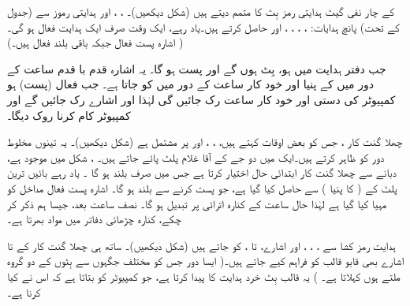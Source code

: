  کے چار   نفی گیٹ  ہدایتی رمز بِٹ  کا متمم دیتے ہیں (شکل  دیکھیں)۔ ، ، اور ہدایتی  رموز سے  (جدول  کے تحت) پانچ  ہدایات: ، ، ، ، اور    حاصل کرتے ہیں۔یاد رہے، ایک وقت صرف ایک ہدایت فعال ہو گی۔ ( اشارہ پست فعال جبکہ باقی بلند فعال ہیں۔)

جب   دفتر ہدایت میں  ہو،  بِٹ  ہوں گے اور    پست ہو گا۔ یہ اشارہ   قدم با قدم  ساعت  کے  دور  میں   کے پنیا  اور خود کار ساعت کے دور میں  کو جاتا ہے۔  جب    فعال (پست) ہو کمپیوٹر کی دستی اور خود کار  ساعت  رک جائیں گی  لہٰذا  اور  اشارے رک جائیں گے اور کمپیوٹر  کام کرنا روک  دیگا۔

چھلا گنت کار ، جس کو بعض اوقات کہتے ہیں، ، ، اور  پر مشتمل ہے (شکل  دیکھیں)۔ یہ  تینوں  مخلوط دور  کو ظاہر کرتے ہیں۔ایک  میں  دو جے کے آقا غلام پلٹ پائے جاتے ہیں۔ ، شکل  میں موجود ہے،  دبانے سے   چھلا گنت کار  ابتدائی  حال اختیار کرتا ہے جس میں صرف  بلند ہو گا ۔ یاد رہے  بائیں ترین پلٹ کے  ( کا پنیا ) سے  حاصل کیا گیا ہے، جو  پست  کرنے سے  بلند ہو گا۔  اشارہ  پست فعال مداخل کو مہیا کیا گیا ہے لہٰذا  حال ساعت کے کنارہ اترائی پر تبدیل ہو گا۔ نصف ساعت بعد، جیسا ہم ذکر کر چکے، کنارہ چڑھائی  دفاتر میں مواد بھرتا  ہے۔

ہدایت رمز کشا سے ، ، ،  اور   اشارے،  تا ، کو جاتے ہیں (شکل  دیکھیں)۔ ساتھ ہی چھلا گنت کار کے  تا   اشارے بھی قابو قالب کو فراہم کیے جاتے ہیں۔( ایسا  دور جس کو  مختلف جگہوں سے بِٹوں کے دو گروہ ملتے ہوں کہلاتا ہے۔ ) یہ قالب  بِٹ  خرد ہدایت کا  پیدا کرتا ہے، جو کمپیوٹر کو بتاتا ہے کہ اس نے کیا کرنا ہے۔


